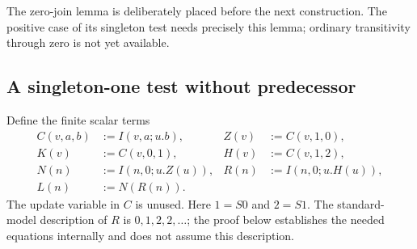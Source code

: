 \documentclass[11pt,letterpaper]{article}
\theoremstyle{definition}
\theoremstyle{remark}
\begin{document}
The zero-join lemma is deliberately placed before the next construction.
The positive case of its singleton test needs precisely this lemma;
ordinary transitivity through zero is not yet available.

\subsection{A singleton-one test without predecessor}

Define the finite scalar terms
\[
\begin{aligned}
 C(v,a,b)&:=I(v,a;u.b),& Z(v)&:=C(v,1,0),\\
 K(v)&:=C(v,0,1),& H(v)&:=C(v,1,2),\\
 N(n)&:=I(n,0;u.Z(u)),& R(n)&:=I(n,0;u.H(u)),\\
 L(n)&:=N(R(n)).
\end{aligned}
\tag{Tests}\label{zs:tests}
\]
The update variable in $C$ is unused. Here $1=S0$ and $2=S1$.
The standard-model description of $R$ is $0,1,2,2,\ldots$; the proof
below establishes the needed equations internally and does not assume
this description.
\end{document}
